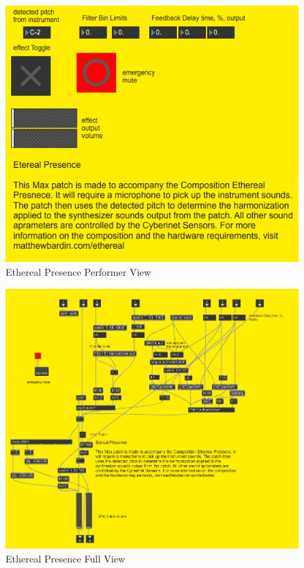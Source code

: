 \begin{figure}
    \centering
    \includegraphics{diagrams/maxPatches/ethereal_pres.png}
    \caption{Ethereal Presence Performer View}
    \label{fig:etherealPerf}
\end{figure}

\begin{figure}
    \centering
    \includegraphics[scale=0.75]{diagrams/maxPatches/ethereal_raw.png}
    \caption{Ethereal Presence Full View}
    \label{fig:etherealRaw}
\end{figure}

